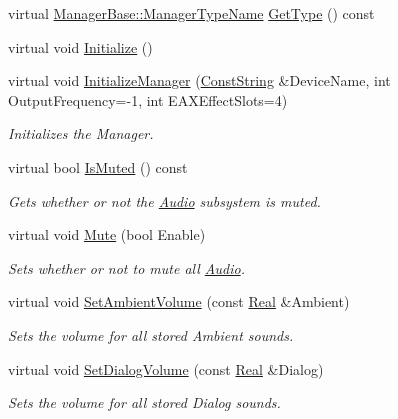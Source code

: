 \begin{DoxyCompactItemize}
virtual \hyperlink{classMezzanine_1_1ManagerBase_a08cecf5169cad3e82be81a3a159b0b6e}{ManagerBase::ManagerTypeName} \hyperlink{classMezzanine_1_1AudioManager_a42f2b4b8065387117042bf7eadc97356}{GetType} () const 
\item 
virtual void \hyperlink{classMezzanine_1_1AudioManager_a24f1464e3de9d95e3c50c276f9e176e6}{Initialize} ()
\item 
virtual void \hyperlink{classMezzanine_1_1AudioManager_a5b1d2072c7b4b9813667f6eb0e079d96}{InitializeManager} (\hyperlink{namespaceMezzanine_a63cd699ac54b73953f35ec9cfc05e506}{ConstString} \&DeviceName, int OutputFrequency=-\/1, int EAXEffectSlots=4)
\begin{DoxyCompactList}\small\item\em Initializes the Manager. \item\end{DoxyCompactList}\item 
virtual bool \hyperlink{classMezzanine_1_1AudioManager_abd9029e2783691428d1d6031560ee743}{IsMuted} () const 
\begin{DoxyCompactList}\small\item\em Gets whether or not the \hyperlink{namespaceMezzanine_1_1Audio}{Audio} subsystem is muted. \item\end{DoxyCompactList}\item 
virtual void \hyperlink{classMezzanine_1_1AudioManager_a2df3cdf8b7fcfe844847f6181d788e5c}{Mute} (bool Enable)
\begin{DoxyCompactList}\small\item\em Sets whether or not to mute all \hyperlink{namespaceMezzanine_1_1Audio}{Audio}. \item\end{DoxyCompactList}\item 
virtual void \hyperlink{classMezzanine_1_1AudioManager_a57a2ac96d43af13df8f11112515c3b96}{SetAmbientVolume} (const \hyperlink{namespaceMezzanine_a726731b1a7df72bf3583e4a97282c6f6}{Real} \&Ambient)
\begin{DoxyCompactList}\small\item\em Sets the volume for all stored Ambient sounds. \item\end{DoxyCompactList}\item 
virtual void \hyperlink{classMezzanine_1_1AudioManager_ab69018e84430a5dc4facb23341e3aeb3}{SetDialogVolume} (const \hyperlink{namespaceMezzanine_a726731b1a7df72bf3583e4a97282c6f6}{Real} \&Dialog)
\begin{DoxyCompactList}\small\item\em Sets the volume for all stored Dialog sounds. \item\end{DoxyCompactList}\item 

\end{DoxyCompactItemize}

